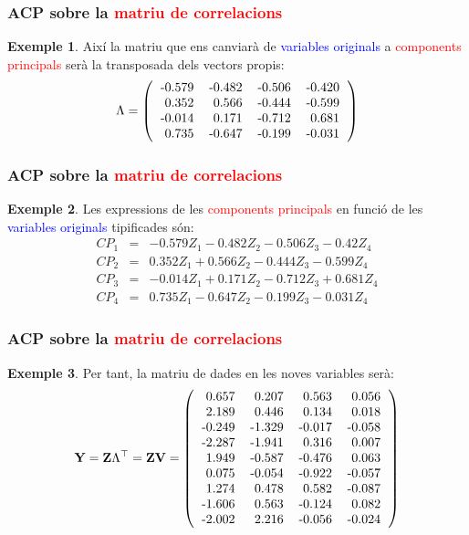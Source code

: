 \documentclass[12pt,t]{beamer}
\newcommand{\red}[1]{\textcolor{red}{#1}}
\newcommand{\blue}[1]{\textcolor{blue}{#1}}
\theoremstyle{plain}
\theoremstyle{definition}
\newtheorem{exemple}{Exemple}
\begin{document}
\begin{frame}
\frametitle{ACP sobre la \red{matriu de correlacions}}
\begin{exemple}
{
Així la matriu que ens canviarà de \blue{variables originals} a \red{components principals} serà la transposada dels 
vectors propis:
\[
\Lambda=
\left(
\begin{tabular}{rrrr}
  -0.579 & -0.482 & -0.506 & -0.420 \\ 
  0.352 & 0.566 & -0.444 & -0.599 \\ 
  -0.014 & 0.171 & -0.712 & 0.681 \\ 
  0.735 & -0.647 & -0.199 & -0.031 \\ 
  \end{tabular}\right)
\]
}
\end{exemple}
\end{frame}


\begin{frame}
\frametitle{ACP sobre la \red{matriu de correlacions}}
\begin{exemple}
Les expressions de les \red{components principals} en funció de les \blue{variables originals} tipificades són:
\begin{eqnarray*}
CP_1 &=& -0.579Z_1 
-0.482Z_2
-0.506Z_3 
-0.42Z_4
\\
CP_2 &=& 0.352Z_1
+0.566Z_2
-0.444Z_3 
-0.599Z_4
\\
CP_3 &=& -0.014Z_1
+0.171Z_2
-0.712Z_3 
+0.681Z_4 \\
CP_4 &=& 0.735Z_1
-0.647Z_2
-0.199Z_3 
-0.031Z_4
\end{eqnarray*}
\end{exemple}
\end{frame}

\begin{frame}
\frametitle{ACP sobre la \red{matriu de correlacions}}
\begin{exemple}
{\small
Per tant, la matriu de dades en les noves variables serà:
\[
\mathbf{Y}={\mathbf{Z}}\Lambda^\top = {\mathbf{Z}}\mathbf{V}=
\left(
\begin{tabular}{rrrr}
  0.657 & 0.207 & 0.563 & 0.056 \\ 
  2.189 & 0.446 & 0.134 & 0.018 \\ 
  -0.249 & -1.329 & -0.017 & -0.058 \\ 
  -2.287 & -1.941 & 0.316 & 0.007 \\ 
  1.949 & -0.587 & -0.476 & 0.063 \\ 
  0.075 & -0.054 & -0.922 & -0.057 \\ 
  1.274 & 0.478 & 0.582 & -0.087 \\ 
  -1.606 & 0.563 & -0.124 & 0.082 \\ 
  -2.002 & 2.216 & -0.056 & -0.024 \\ 
  \end{tabular}\right)
\]
}
\end{exemple}
\end{frame}
\end{document}

